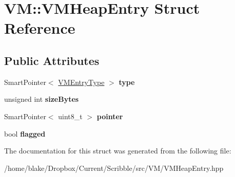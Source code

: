 \hypertarget{struct_v_m_1_1_v_m_heap_entry}{\section{V\-M\-:\-:V\-M\-Heap\-Entry Struct Reference}
\label{struct_v_m_1_1_v_m_heap_entry}
}
\subsection*{Public Attributes}
\begin{DoxyCompactItemize}
\item 
\hypertarget{struct_v_m_1_1_v_m_heap_entry_a8f26d4d459965e613e8d16834fefb0fb}{Smart\-Pointer$<$ \hyperlink{class_v_m_1_1_v_m_entry_type}{V\-M\-Entry\-Type} $>$ {\bfseries type}}\label{struct_v_m_1_1_v_m_heap_entry_a8f26d4d459965e613e8d16834fefb0fb}

\item 
\hypertarget{struct_v_m_1_1_v_m_heap_entry_add1ede23c9111ec87cdaa0d4376c9705}{unsigned int {\bfseries size\-Bytes}}\label{struct_v_m_1_1_v_m_heap_entry_add1ede23c9111ec87cdaa0d4376c9705}

\item 
\hypertarget{struct_v_m_1_1_v_m_heap_entry_a72120cd58ce16845b5e42c1085d9ed7e}{Smart\-Pointer$<$ uint8\-\_\-t $>$ {\bfseries pointer}}\label{struct_v_m_1_1_v_m_heap_entry_a72120cd58ce16845b5e42c1085d9ed7e}

\item 
\hypertarget{struct_v_m_1_1_v_m_heap_entry_add28c938f66af42411e53299d4254742}{bool {\bfseries flagged}}\label{struct_v_m_1_1_v_m_heap_entry_add28c938f66af42411e53299d4254742}

\end{DoxyCompactItemize}


The documentation for this struct was generated from the following file\-:\begin{DoxyCompactItemize}
\item 
/home/blake/\-Dropbox/\-Current/\-Scribble/src/\-V\-M/V\-M\-Heap\-Entry.\-hpp\end{DoxyCompactItemize}
